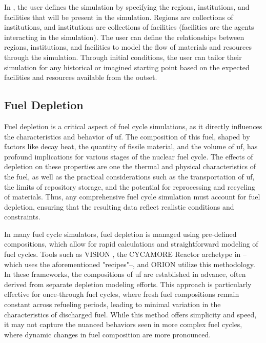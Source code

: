 
In \cyclus, the user defines the simulation by specifying the regions,
institutions, and facilities that will be present in the simulation. Regions
are collections of institutions, and institutions are collections of facilities
(facilities are the agents interacting in the simulation). The user can define
the relationships between regions, institutions, and facilities to model the
flow of materials and resources through the simulation. Through initial
conditions, the user can tailor their simulation for any historical or imagined
starting point based on the expected facilities and resources available from
the outset.

\subsection{Fuel Depletion}
\label{sec:depletion}

Fuel depletion is a critical aspect of fuel cycle simulations, as it directly
influences the characteristics and behavior of \gls{uf}. The composition of
this fuel, shaped by factors like decay heat, the quantity of fissile material,
and the volume of \gls{uf}, has profound implications for various stages of the
nuclear fuel cycle. The effects of depletion on these properties are one the
thermal and physical characteristics of the fuel, as well as the practical
considerations such as the transportation of \gls{uf}, the limits of repository
storage, and the potential for reprocessing and recycling of materials. Thus,
any comprehensive fuel cycle simulation must account for fuel depletion,
ensuring that the resulting data reflect realistic conditions and constraints.

In many fuel cycle simulators, fuel depletion is managed using pre-defined
compositions, which allow for rapid calculations and straightforward modeling
of fuel cycles. Tools such as VISION \cite{yacout_visionverifiable_2006}, the
CYCAMORE Reactor archetype in \cyclus--which uses the aforementioned
"recipes"--, and ORION utilize this methodology. In these frameworks, the
compositions of \gls{uf} are established in advance, often derived from
separate depletion modeling efforts. This approach is particularly effective
for once-through fuel cycles, where fresh fuel compositions remain constant
across refueling periods, leading to minimal variation in the characteristics
of discharged fuel. While this method offers simplicity and speed, it may not
capture the nuanced behaviors seen in more complex fuel cycles, where dynamic
changes in fuel composition are more pronounced.

